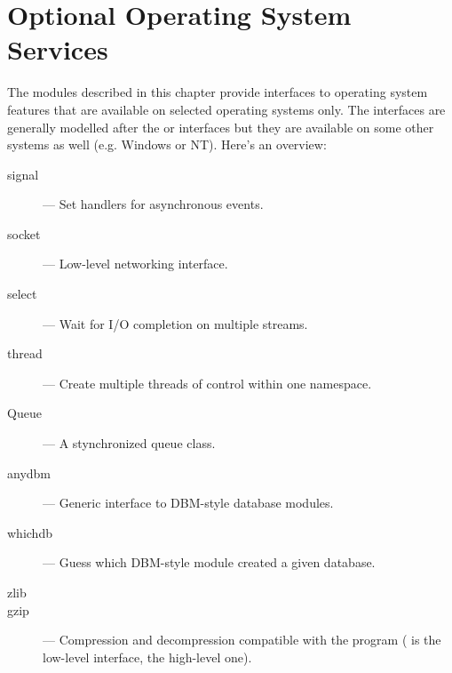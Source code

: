 \chapter{Optional Operating System Services}
\label{someos}

The modules described in this chapter provide interfaces to operating
system features that are available on selected operating systems only.
The interfaces are generally modelled after the \UNIX{} or \C{}
interfaces but they are available on some other systems as well
(e.g. Windows or NT).  Here's an overview:

\begin{description}

\item[signal]
--- Set handlers for asynchronous events.

\item[socket]
--- Low-level networking interface.

\item[select]
--- Wait for I/O completion on multiple streams.

\item[thread]
--- Create multiple threads of control within one namespace.

\item[Queue]
--- A stynchronized queue class.

\item[anydbm]
--- Generic interface to DBM-style database modules.

\item[whichdb]
--- Guess which DBM-style module created a given database.

\item[zlib]
\item[gzip]
--- Compression and decompression compatible with the
 program ( is the low-level interface,
 the high-level one).

\end{description}
